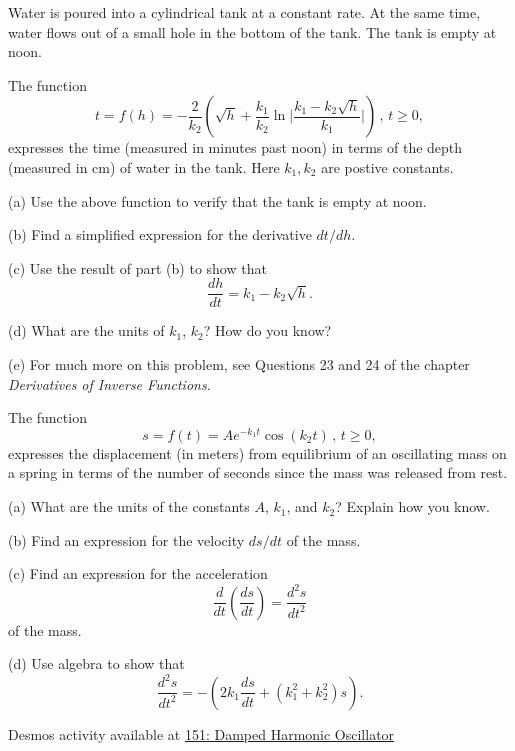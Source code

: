 \documentclass{ximera}
\begin{document}
\begin{question}  \label{Q:MXCXV}
Water is poured into a cylindrical tank at a constant rate. At the same time, water flows out of a small hole in the bottom of the tank. The tank is empty at noon.

The function
\[
      t = f(h) = - \frac{2}{k_2}  \left( \sqrt{h}+ \frac{k_1}{k_2} \ln \Bigg| \frac{k_1 - k_2 \sqrt{h}}{k_1}   \Bigg| \right)\, , \, t\geq 0 ,
\]
expresses the time (measured in minutes past noon) in terms of the depth (measured in cm) of water in the tank. Here $k_1,k_2$ are postive constants.

(a) Use the above function to verify that the tank is empty at noon.

(b) Find a simplified expression for the derivative $dt/dh$.

(c) Use the result of part (b) to show that
\[
   \frac{dh}{dt} = k_1 - k_2 \sqrt{h}.
\]

(d) What are the units of $k_1$, $k_2$? How do you know?

(e) For much more on this problem, see Questions 23 and 24 of the chapter \emph{Derivatives of Inverse Functions}.

\end{question} 


\begin{question}  \label{Q:LDKVMdecvd}
The function
\[
      s = f(t) = Ae^{-k_1t} \cos(k_2t) \, , \, t\geq 0,
\]
expresses the displacement (in meters) from equilibrium of an oscillating mass on a spring in terms of the number of seconds since the mass was released from rest.

(a) What are the units of the constants $A$, $k_1$, and $k_2$? Explain how you know.

(b) Find an expression for the velocity $ds/dt$ of the mass.

(c) Find an expression for the acceleration
\[
   \frac{d}{dt} \left( \frac{ds}{dt}  \right)  = \frac{d^2s}{dt^2}
\]
of the mass.

(d) Use algebra to show that
\[
     \frac{d^2s}{dt^2} = - \left( 2k_1 \frac{ds}{dt} + (k_1^2 + k_2^2) s \right) .
\]


\begin{onlineOnly}
    \begin{center}
\end{center}
\end{onlineOnly}

Desmos activity available at \href{https://www.desmos.com/calculator/ygikqgj7af}{151: Damped Harmonic Oscillator}

\end{question}
\end{document}
